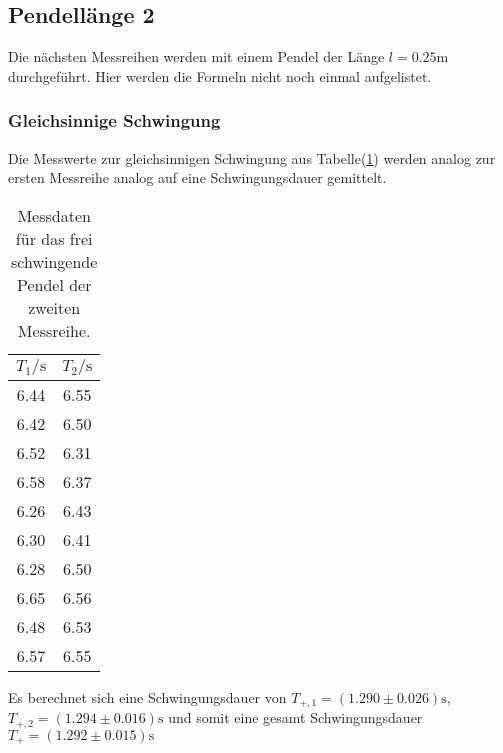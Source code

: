     \subsection{Pendellänge 2}

        \noindent Die nächsten Messreihen werden mit einem Pendel der Länge $l = 0.25 \si{\m}$ durchgeführt. Hier werden die Formeln 
        nicht noch einmal aufgelistet.

        \subsubsection{Gleichsinnige Schwingung}

            \noindent Die Messwerte zur gleichsinnigen Schwingung aus Tabelle(\ref{tab:frei2}) werden analog zur ersten Messreihe analog auf 
            eine Schwingungsdauer gemittelt.

            \begin{table}[ht]
                \centering
                \caption{Messdaten für das frei schwingende Pendel der zweiten Messreihe.}
                \label{tab:frei2}
                \begin{tabular}{c c}
                 \toprule
                 $T_1 / \si{\s}$ & $T_2 / \si{\s}$\\
                 \midrule
                 6.44  &  6.55 \\
                 6.42  &  6.50 \\
                 6.52  &  6.31 \\
                 6.58  &  6.37 \\
                 6.26  &  6.43 \\
                 6.30  &  6.41 \\
                 6.28  &  6.50 \\
                 6.65  &  6.56 \\
                 6.48  &  6.53 \\
                 6.57  &  6.55 \\
                 \bottomrule
                \end{tabular}
            \end{table}
            
            \noindent Es berechnet sich eine Schwingungsdauer von $T_{+,1} = (1.290 \pm 0.026) \si{\second}$, $T_{+,2} = (1.294 \pm 0.016) \si{\second}$
            und somit eine gesamt Schwingungsdauer $T_+ = (1.292 \pm 0.015) \si{\second}$

